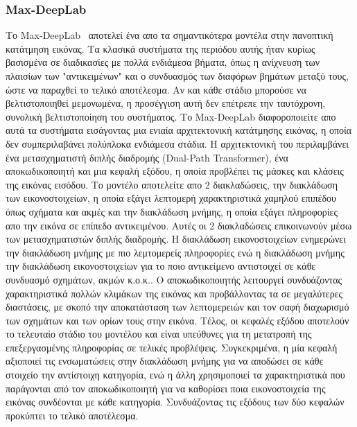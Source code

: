 \documentclass[12pt]{article}
\numberwithin{equation}{section}
\begin{document}
\subsubsection{Max-DeepLab}

Το Max-DeepLab~\cite{wang2021maxdeeplabendtoendpanopticsegmentation} αποτελεί ένα απο τα σημαντικότερα μοντέλα στην πανοπτική κατάτμηση εικόνας. Τα κλασικά συστήματα της περιόδου αυτής ήταν κυρίως βασισμένα σε διαδικασίες με πολλά ενδιάμεσα βήματα, όπως η ανίχνευση των πλαισίων των "αντικειμένων" και ο συνδυασμός των διαφόρων βημάτων μεταξύ τους, ώστε να παραχθεί το τελικό αποτέλεσμα. Αν και κάθε στάδιο μπορούσε να βελτιστοποιηθεί μεμονωμένα, η προσέγγιση αυτή δεν επέτρεπε την ταυτόχρονη, συνολική βελτιστοποίηση του συστήματος. Το  Max-DeepLab διαφοροποιείτε απο αυτά τα συστήματα εισάγοντας μια ενιαία αρχιτεκτονική κατάτμησης εικόνας, η οποία δεν συμπεριλαβάνει πολύπλοκα ενδιάμεσα στάδια. Η αρχιτεκτονική του περιλαμβάνει ένα μετασχηματιστή διπλής διαδρομής (Dual-Path Transformer), ένα αποκωδικοποιητή και μια κεφαλή εξόδου, η οποία προβλέπει τις μάσκες και κλάσεις της εικόνας εισόδου. Το μοντέλο αποτελείτε απο 2 διακλαδώσεις, την διακλάδωση των εικονοστοιχείων, η οποία εξάγει λεπτομερή χαρακτηριστικά χαμηλού επιπέδου όπως σχήματα και ακμές και την διακλάδωση μνήμης, η οποία εξάγει πληροφορίες απο την εικόνα σε επίπεδο αντικειμένου. Αυτές οι 2 διακλαδώσεις επικοινωνούν μέσω των μετασχηματιστών διπλής διαδρομής. Η διακλάδωση εικονοστοιχείων ενημερώνει την διακλάδωση μνήμης με πιο λεμτομερείς πληροφορίες ενώ η διακλάδωση μνήμης την διακλάδωση εικονοστοιχείων για το ποιο αντικείμενο αντιστοιχεί σε κάθε συνδυασμό σχημάτων, ακμών κ.ο.κ.. Ο αποκωδικοποιητής λειτουργεί συνδυάζοντας χαρακτηριστικά πολλών κλιμάκων της εικόνας και προβάλλοντας τα σε μεγαλύτερες διαστάσεις, με σκοπό την αποκατάσταση των λεπτομερειών και τον σαφή διαχωρισμό των σχημάτων και των ορίων τους στην εικόνα. Τέλος, οι κεφαλές εξόδου αποτελούν το τελευταίο στάδιο του μοντέλου και είναι υπεύθυνες για τη μετατροπή της επεξεργασμένης πληροφορίας σε τελικές προβλέψεις. Συγκεκριμένα, η μία κεφαλή αξιοποιεί τις ενσωματώσεις στην διακλάδωση μνήμης για να αποδώσει σε κάθε στοιχείο την αντίστοιχη κατηγορία, ενώ η άλλη χρησιμοποιεί τα χαρακτηριστικά που παράγονται από τον αποκωδικοποιητή για να καθορίσει ποια εικονοστοιχεία της εικόνας συνδέονται με κάθε κατηγορία. Συνδυάζοντας τις εξόδους των δύο κεφαλών προκύπτει το τελικό αποτέλεσμα.\\
\end{document}
